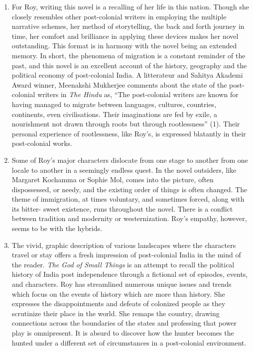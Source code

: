 \begin{enumerate}
  \item For Roy, writing this novel is a recalling of her life in this nation.  Though she closely resembles other post-colonial writers in employing the multiple narrative schemes, her method of storytelling, the back and forth journey in time, her comfort and brilliance in applying these devices makes her novel outstanding.  This format is in harmony with the novel being an extended memory.  In short, the phenomena of migration is a constant reminder of the past, and this novel is an excellent account of the history, geography and the political economy of post-colonial India. A litterateur and Sahitya Akademi Award winner, Meenakshi Mukherjee comments about the state of the post-colonial writers in \emph{The Hindu} as, “The post-colonial writers are known for having managed to migrate between languages, cultures, countries, continents, even civilisations.  Their imaginations are fed by exile, a nourishment not drawn through roots but through rootlessness” (1).  Their personal experience of rootlessness, like Roy’s, is expressed blatantly in their post-colonial works.

  \item Some of Roy’s major characters dislocate from one stage to another from one locale to another in a seemingly endless quest. In the novel outsiders, like Margaret Kochamma or Sophie Mol, comes into the picture, often dispossessed, or needy, and the existing order of things is often changed.  The theme of immigration, at times voluntary, and sometimes forced, along with its bitter- sweet existence, runs throughout the novel. There is a conflict between tradition and modernity or westernization. Roy’s empathy, however, seems to be with the hybrids.

  \item The vivid, graphic description of various landscapes where the characters travel or stay offers a fresh impression of post-colonial India in the mind of the reader.  \emph{The God of Small Things} is an attempt to recall the political history of India post independence through a fictional set of episodes, events, and characters. Roy has streamlined numerous unique issues and trends which focus on the events of history which are more than history.  She expresses the disappointments and defeats of colonized people as they scrutinize their place in the world.  She remaps the country, drawing connections across the boundaries of the states and professing that power play is omnipresent. It is absurd to discover how the hunter becomes the hunted under a different set of circumstances in a post-colonial environment. 


\end{enumerate}

